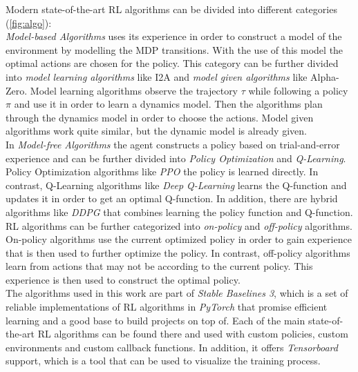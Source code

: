 Modern state-of-the-art RL algorithms can be divided into different categories (\cref{fig:algo}):\\
\emph{Model-based Algorithms} uses its experience in order to construct a model of the environment by modelling the MDP transitions. 
With the use of this model the optimal actions are chosen for the policy. This category can be further divided into \emph{model learning algorithms} 
like I2A and \emph{model given algorithms} like Alpha-Zero. 
Model learning algorithms observe the trajectory $\tau$ while following a policy $\pi$ and use it in order to learn a dynamics model. 
Then the algorithms plan through the dynamics model in order to choose the actions.
Model given algorithms work quite similar, but the dynamic model is already given.\\
In \emph{Model-free Algorithms} the agent constructs a policy based on trial-and-error experience and can be further divided into 
\emph{Policy Optimization} and \emph{Q-Learning}.
Policy Optimization algorithms like \emph{PPO} the policy is learned directly. 
In contrast, Q-Learning algorithms like \emph{Deep Q-Learning} learns the Q-function and updates it in order to get an optimal Q-function. 
In addition, there are hybrid algorithms like \emph{DDPG} that combines learning the policy function and Q-function.\\
RL algorithms can be further categorized into \emph{on-policy} and \emph{off-policy} algorithms. 
On-policy algorithms use the current optimized policy in order to gain experience that is then used to further optimize the policy. 
In contrast, off-policy algorithms learn from actions that may not be according to the current policy. 
This experience is then used to construct the optimal policy.\\
The algorithms used in this work are part of \emph{Stable Baselines 3}\cite{stable-baselines3}, 
which is a set of reliable implementations of RL algorithms in \emph{PyTorch} that promise efficient learning and a good base to build projects on top of. 
Each of the main state-of-the-art RL algorithms can be found there and used with custom policies, custom environments and custom callback functions. 
In addition, it offers \emph{Tensorboard} support, which is a tool that can be used to visualize the training process.

\newpage
